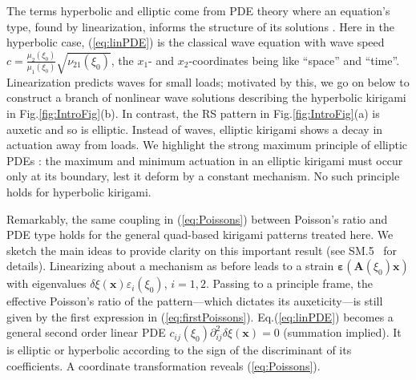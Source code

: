 \documentclass[aps,prl,twocolumn,superscriptaddress]{revtex4-1}
\begin{document}
 

The terms hyperbolic and elliptic come from PDE theory where an equation's type, found by linearization, informs the structure of its solutions \cite{courant2008methods,evans10}. Here in the hyperbolic case,  (\ref{eq:linPDE}) is the classical wave
equation with wave speed $c=\tfrac{\mu_2(\xi_0)}{\mu_1(\xi_0)}\sqrt{\nu_{21}(\xi_0)}$, the $x_{1}$- and $x_{2}$-coordinates being like ``space'' and ``time''. Linearization predicts waves for small loads; motivated by this, we go on below to construct a branch of nonlinear wave solutions describing the hyperbolic kirigami in Fig.\;\ref{fig:IntroFig}(b).
In contrast, the RS pattern in Fig.\;\ref{fig:IntroFig}(a) is auxetic and so is elliptic.  Instead of waves, elliptic kirigami shows a decay in  actuation away from  loads. We highlight the strong maximum principle of elliptic PDEs \cite{evans10}: the maximum and minimum actuation in an elliptic kirigami must occur only at its boundary, lest it deform by a constant mechanism. No such principle holds for hyperbolic kirigami. 
 
Remarkably, the same coupling in (\ref{eq:Poissons}) between Poisson's ratio and PDE type holds for the general quad-based kirigami patterns treated here. 
 We sketch the main ideas to provide clarity on this important result (see SM.5~\cite{suppl} for details). 
 Linearizing about a mechanism as before leads to a strain   $\boldsymbol{\varepsilon}(\mathbf{A}(\xi_0)\mathbf{x})$ with eigenvalues $\delta \xi(\mathbf{x}) \varepsilon_i(\xi_0)$, $i=1,2$. 
 Passing to a principle frame, the effective Poisson's ratio  of the  pattern---which dictates its auxeticity---is still given by the first expression in (\ref{eq:firstPoissons}).
 Eq.\;(\ref{eq:linPDE}) becomes a general second order linear PDE $c_{ij}(\xi_0)\partial^2_{ij}\delta\xi(\mathbf{x}) =0$ (summation implied). It is elliptic or hyperbolic according to the sign of the discriminant of its coefficients. A coordinate transformation reveals (\ref{eq:Poissons}). 
 
\end{document}
